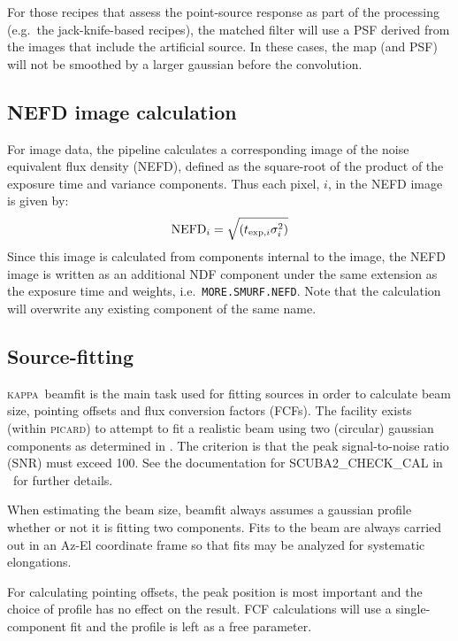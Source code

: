 \documentclass[twoside,11pt,nolof]{starlink}
\providecommand{\KAPPA}{\textsc{kappa}}
\providecommand{\picard}{\textsc{picard}}
\providecommand{\picardsun}{\xref{SUN/265}{sun265}{}}
\providecommand{\task}[1]{\textsf{#1}}
\providecommand{\snrmin}{100}
\begin{document}
For those recipes that assess the point-source response as part of the
processing (e.g.\ the jack-knife-based recipes), the matched filter
will use a PSF derived from the images that include the artificial
source. In these cases, the map (and PSF) will not be smoothed by a
larger gaussian before the convolution.

\subsection{NEFD image calculation}

For image data, the pipeline calculates a corresponding image of the
noise equivalent flux density (NEFD), defined as the square-root of
the product of the exposure time and variance components. Thus each
pixel, $i$, in the NEFD image is given by:
\begin{equation}
{\rm NEFD}_i = \sqrt{(t_{{\rm exp},i} \sigma_i^2)}
\end{equation}
Since this image is calculated from components internal to the image,
the NEFD image is written as an additional NDF component under the
same extension as the exposure time and weights, i.e.\,
\verb+MORE.SMURF.NEFD+. Note that the calculation will overwrite any
existing component of the same name.

\subsection{Source-fitting}

\KAPPA\ \task{beamfit} is the main task used for fitting sources in
order to calculate beam size, pointing offsets and flux conversion
factors (FCFs). The facility exists (within \picard) to attempt to fit
a realistic beam using two (circular) gaussian components as
determined in \cite{scuba2calpaper}. The criterion is that the peak
signal-to-noise ratio (SNR) must exceed \snrmin. See the documentation
for \task{SCUBA2\_CHECK\_CAL} in \picardsun\ for further details.

When estimating the beam size, \task{beamfit} always assumes a
gaussian profile whether or not it is fitting two components. Fits to
the beam are always carried out in an Az-El coordinate frame so that
fits may be analyzed for systematic elongations.

For calculating pointing offsets, the peak position is most important
and the choice of profile has no effect on the result. FCF
calculations will use a single-component fit and the profile is left
as a free parameter.
\end{document}

